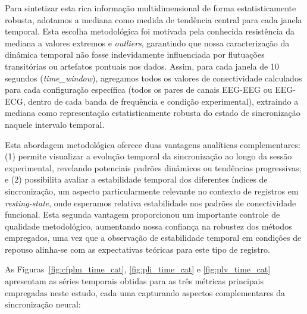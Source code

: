 Para sintetizar esta rica informação multidimensional de forma estatisticamente robusta, adotamos a mediana como medida de tendência central para cada janela temporal. Esta escolha metodológica foi motivada pela conhecida resistência da mediana a valores extremos e \textit{outliers}, garantindo que nossa caracterização da dinâmica temporal não fosse indevidamente influenciada por flutuações transitórias ou artefatos pontuais nos dados. Assim, para cada janela de 10 segundos (\textit{time\_window}), agregamos todos os valores de conectividade calculados para cada configuração específica (todos os pares de canais EEG-EEG ou EEG-ECG, dentro de cada banda de frequência e condição experimental), extraindo a mediana como representação estatisticamente robusta do estado de sincronização naquele intervalo temporal.

Esta abordagem metodológica oferece duas vantagens analíticas complementares: (1) permite visualizar a evolução temporal da sincronização ao longo da sessão experimental, revelando potenciais padrões dinâmicos ou tendências progressivas; e (2) possibilita avaliar a estabilidade temporal dos diferentes índices de sincronização, um aspecto particularmente relevante no contexto de registros em \textit{resting-state}, onde esperamos relativa estabilidade nos padrões de conectividade funcional. Esta segunda vantagem proporcionou um importante controle de qualidade metodológico, aumentando nossa confiança na robustez dos métodos empregados, uma vez que a observação de estabilidade temporal em condições de repouso alinha-se com as expectativas teóricas para este tipo de registro.

As Figuras~\ref{fig:cfplm_time_cat}, \ref{fig:pli_time_cat} e \ref{fig:plv_time_cat} apresentam as séries temporais obtidas para as três métricas principais empregadas neste estudo, cada uma capturando aspectos complementares da sincronização neural:

